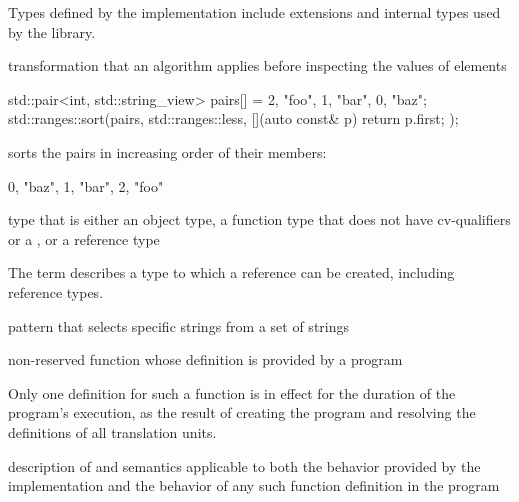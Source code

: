\begin{defnote}
Types defined by the implementation include
extensions and internal types used by the library.
\end{defnote}

%
transformation that an algorithm applies
before inspecting the values of elements

\begin{example}
\begin{codeblock}
std::pair<int, std::string_view> pairs[] = {{2, "foo"}, {1, "bar"}, {0, "baz"}};
std::ranges::sort(pairs, std::ranges::less{}, [](auto const& p) { return p.first; });
\end{codeblock}
sorts the pairs in increasing order of their  members:
\begin{codeblock}
{{0, "baz"}, {1, "bar"}, {2, "foo"}}
\end{codeblock}
\end{example}

%
type that is either an
object type, a function type that does not have cv-qualifiers or a
, or a reference type

\begin{defnote}
The term describes a type to which a reference can be created,
including reference types.
\end{defnote}

pattern that selects specific strings
from a set of  strings

%
non-reserved function
whose definition is provided by a \Cpp{} program

\begin{defnote}
Only one definition for such a function is in effect for the duration of the program's
execution, as the result of creating the program and resolving the
definitions of all translation units.
\end{defnote}

%
description of 
and  semantics
applicable to both the behavior provided by the implementation and
the behavior of any such function definition in the program

